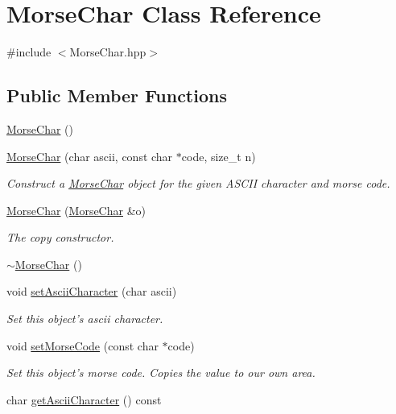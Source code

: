 \hypertarget{class_morse_char}{\section{Morse\-Char Class Reference}
\label{class_morse_char}
}


{\ttfamily \#include $<$Morse\-Char.\-hpp$>$}

\subsection*{Public Member Functions}
\begin{DoxyCompactItemize}
\item 
\hyperlink{class_morse_char_aff6cb64cd26d9f8da4b98c0509f2466c}{Morse\-Char} ()
\item 
\hyperlink{class_morse_char_a89474aae39578b6d9f76792ba5e7c67e}{Morse\-Char} (char ascii, const char $\ast$code, size\-\_\-t n)
\begin{DoxyCompactList}\small\item\em Construct a \hyperlink{class_morse_char}{Morse\-Char} object for the given A\-S\-C\-I\-I character and morse code. \end{DoxyCompactList}\item 
\hyperlink{class_morse_char_a2182aa713ab02e0ca477d1bd2b00d11b}{Morse\-Char} (\hyperlink{class_morse_char}{Morse\-Char} \&o)
\begin{DoxyCompactList}\small\item\em The copy constructor. \end{DoxyCompactList}\item 
\hyperlink{class_morse_char_ab53e6f03baf6f884ae3e82d1efcf2c2d}{$\sim$\-Morse\-Char} ()
\item 
void \hyperlink{class_morse_char_a0e4dab38c100140295c3ee97883112bd}{set\-Ascii\-Character} (char ascii)
\begin{DoxyCompactList}\small\item\em Set this object's ascii character. \end{DoxyCompactList}\item 
void \hyperlink{class_morse_char_a9af48458014562d206a6e6367c93d8dc}{set\-Morse\-Code} (const char $\ast$code)
\begin{DoxyCompactList}\small\item\em Set this object's morse code. Copies the value to our own area. \end{DoxyCompactList}\item 
char \hyperlink{class_morse_char_a93848fca8637658b31bcb5986130deae}{get\-Ascii\-Character} () const 

\end{DoxyCompactItemize}
